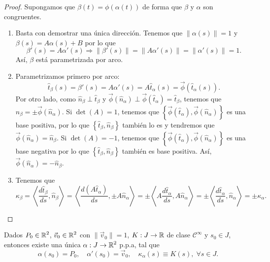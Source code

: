 \begin{proof} Supongamos que $\displaystyle \beta\left(t\right)=\phi\left(\alpha\left(t\right)\right) $ de forma que $\displaystyle \beta  $ y $\displaystyle \alpha  $ son congruentes. 
	\begin{enumerate}
	\item Basta con demostrar una única dirección. Tenemos que $\displaystyle \|\alpha\left(s\right)\| = 1 $ y $\displaystyle \beta\left(s\right)=A\alpha\left(s\right) + B $ por lo que 
\[\beta'\left(s\right)=A\alpha'\left(s\right)\Rightarrow \|\beta'\left(s\right)\|=\|A\alpha'\left(s\right)\|=\|\alpha'\left(s\right)\|=1 .\]
Así, $\displaystyle \beta  $ está parametrizada por arco. 
\item Parametrizamos primero por arco:
	\[\hat{t}_{\beta }\left(s\right)=\beta'\left(s\right)=A\alpha'\left(s\right)=A\hat{t}_{\alpha }\left(s\right)=\vec{\phi}\left(\hat{t}_{\alpha }\left(s\right)\right) .\]
	Por otro lado, como $\displaystyle \hat{n}_{\beta }\perp \hat{t}_{\beta } $ y $\displaystyle \vec{\phi}\left(\hat{n}_{\alpha }\right)\perp \vec{\phi}\left(\hat{t}_{\alpha }\right)=\hat{t}_{\beta } $, tenemos que $\displaystyle \hat{n}_{\beta }=\pm\vec{\phi}\left(\hat{n}_{\alpha }\right) $. 
	Si $\displaystyle \det\left(A\right)=1 $, tenemos que $\displaystyle \left\{ \vec{\phi}\left(\hat{t}_{\alpha }\right), \vec{\phi}\left(\hat{n}_{\alpha }\right)\right\}  $ es una base positiva, por lo que $\displaystyle \left\{ \hat{t}_{\beta }, \hat{n}_{\beta }\right\}  $ también lo es y tendremos que $\displaystyle \vec{\phi}\left(\hat{n}_{\alpha }\right)=\hat{n}_{\beta } $.
	Si $\displaystyle \det\left(A\right)=-1 $, tenemos que $\displaystyle \left\{ \vec{\phi}\left(\hat{t}_{\alpha }\right), \vec{\phi}\left(\hat{n}_{\alpha }\right)\right\}  $ es una base negativa por lo que $\displaystyle \left\{ \hat{t}_{\beta }, \hat{n}_{\beta }\right\}  $ también es base positiva. Así, $\displaystyle \vec{\phi}\left(\hat{n}_{\alpha }\right)=-\hat{n}_{\beta } $. 
\item Tenemos que 
	\[\kappa_{\beta }=\left\langle \frac{d\hat{t}_{\beta }}{d s}, \hat{n}_{\beta } \right\rangle =\left\langle \frac{d\left(A\hat{t}_{\alpha }\right)}{d s}, \pm A\hat{n}_{\alpha } \right\rangle  =\pm \left\langle A\frac{d\hat{t}_{\alpha }}{d s}, A \hat{n}_{\alpha } \right\rangle = \pm \left\langle \frac{d\hat{t}_{\alpha }}{d s}, \hat{n}_{\alpha } \right\rangle =\pm \kappa_{\alpha}.\]
	\end{enumerate}
\end{proof}
\begin{theorem}
Dados $\displaystyle P_{0} \in \mathbb{R}^{2} $, $\displaystyle \vec{v}_{0}\in \mathbb{R}^{2} $ con $\displaystyle \|\vec{v}_{0}\|=1 $, $\displaystyle K : J \to \mathbb{R} $ de clase $\displaystyle \mathcal{C}^{\infty } $ y $\displaystyle s_{0} \in J $, entonces existe una única $\displaystyle \alpha: J \to \mathbb{R}^{2} $ p.p.a, tal que 
	\[\alpha\left(s_{0}\right)=P_{0}, \quad \alpha'\left(s_{0}\right)=\vec{v}_{0}, \quad \kappa_{\alpha }\left(s\right)\equiv K\left(s\right), \; \forall s \in J .\]
\end{theorem}
